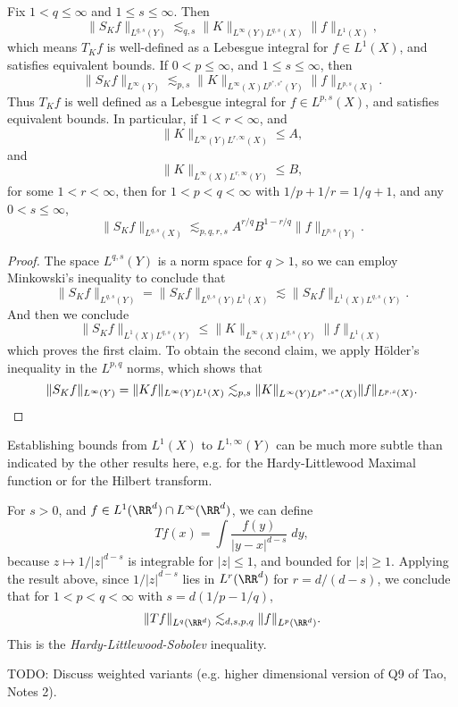 \begin{theorem}
    Fix $1 < q \leq \infty$ and $1 \leq s \leq \infty$. Then
    \[ \| S_K f \|_{L^{q,s}(Y)} \lesssim_{q,s} \| K \|_{L^\infty(Y) L^{q,s}(X)} \| f \|_{L^1(X)}, \]
    which means $T_K f$ is well-defined as a Lebesgue integral for $f \in L^1(X)$, and satisfies equivalent bounds. If $0 < p \leq \infty$, and $1 \leq s \leq \infty$, then
    \[ \| S_K f \|_{L^\infty(Y)} \lesssim_{p,s} \| K \|_{L^\infty(X) L^{p^*,s^*}(Y)} \| f \|_{L^{p,s}(X)}. \]
    Thus $T_K f$ is well defined as a Lebesgue integral for $f \in L^{p,s}(X)$, and satisfies equivalent bounds. In particular, if $1 < r < \infty$, and
    \[ \| K \|_{L^\infty(Y) L^{r,\infty}(X)} \leq A, \]
    and
    \[ \| K \|_{L^\infty(X) L^{r,\infty}(Y)} \leq B, \]
    for some $1 < r < \infty$, then for $1 < p < q < \infty$ with $1/p + 1/r = 1/q + 1$, and any $0 < s \leq \infty$,
    \[ \| S_K f \|_{L^{q,s}(X)} \lesssim_{p,q,r,s} A^{r/q} B^{1 - r/q} \| f \|_{L^{p,s}(Y)}. \]
\end{theorem}
\begin{proof}
    The space $L^{q,s}(Y)$ is a norm space for $q > 1$, so we can employ Minkowski's inequality to conclude that
    \[ \| S_K f \|_{L^{q,s}(Y)} = \| S_K f \|_{L^{q,s}(Y) L^1(X)} \lesssim \| S_K f \|_{L^1(X) L^{q,s}(Y)}. \]
    And then we conclude
    \[ \| S_K f \|_{L^1(X) L^{q,s}(Y)} \leq \| K \|_{L^\infty(X) L^{q,s}(Y)} \| f \|_{L^1(X)} \]
    which proves the first claim. To obtain the second claim, we apply H\"{o}lder's inequality in the $L^{p,q}$ norms, which shows that
    \[ \| S_K f \|_{L^\infty(Y)} = \| K f \|_{L^\infty(Y) L^1(X)} \lesssim_{p,s} \| K \|_{L^\infty(Y) L^{p^*,s^*}(X)} \| f \|_{L^{p,s}(X)}. \qedhere \]
\end{proof}

\begin{remark}
    Establishing bounds from $L^1(X)$ to $L^{1,\infty}(Y)$ can be much more subtle than indicated by the other results here, e.g. for the Hardy-Littlewood Maximal function or for the Hilbert transform.
\end{remark}

\begin{example}
    For $s > 0$, and $f \in L^1(\RR^d) \cap L^\infty(\RR^d)$, we can define
    \[ Tf(x) = \int \frac{f(y)}{|y-x|^{d-s}}\; dy, \]
    because $z \mapsto 1/|z|^{d-s}$ is integrable for $|z| \leq 1$, and bounded for $|z| \geq 1$. Applying the result above, since $1/|z|^{d-s}$ lies in $L^r(\RR^d)$ for $r = d/(d-s)$, we conclude that for $1 < p < q < \infty$ with $s = d(1/p - 1/q)$,
    \[ \| Tf \|_{L^q(\RR^d)} \lesssim_{d,s,p,q} \| f \|_{L^p(\RR^d)}. \]
    This is the \emph{Hardy-Littlewood-Sobolev} inequality.

    TODO: Discuss weighted variants (e.g. higher dimensional version of Q9 of Tao, Notes 2).
\end{example}






